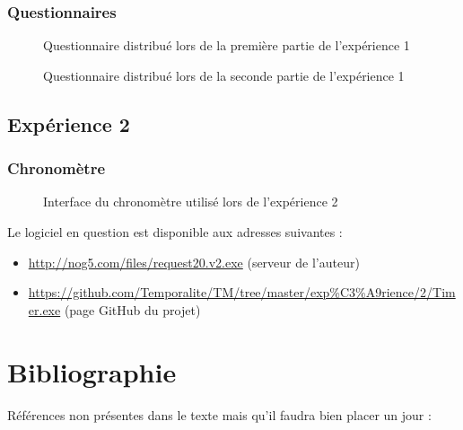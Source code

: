 \documentclass[12pt,fleqn,oneside,openany]{book} %
\begin{document}
\newpage
\subsection*{Questionnaires} \label{sec:Questionnaires}
\begin{figure}[htp] 
	\caption{Questionnaire distribué lors de la première partie de l'expérience 1}
\end{figure}

\newpage
\begin{figure}[htp] 
	\caption{Questionnaire distribué lors de la seconde partie de l'expérience 1}
\end{figure}

\newpage
\section*{Expérience 2}

\subsection*{Chronomètre} \label{sec:chrono}
\begin{figure}[htp] 
	\caption{Interface du chronomètre utilisé lors de l'expérience 2}
\end{figure}
Le logiciel en question est disponible aux adresses suivantes :
\begin{itemize}
\item \url{http://nog5.com/files/request20.v2.exe} (serveur de l'auteur)
\item \url{https://github.com/Temporalite/TM/tree/master/exp%C3%A9rience/2/Timer.exe} (page GitHub du projet)
\end{itemize}



\chapter{Bibliographie}
Références non présentes dans le texte mais qu'il faudra bien placer un jour : \cite{ref1} \cite{vidnul} \cite{vidcool} \cite{imgtitre} \cite{imgheader1} \cite{analysedonnees}
\end{document}
